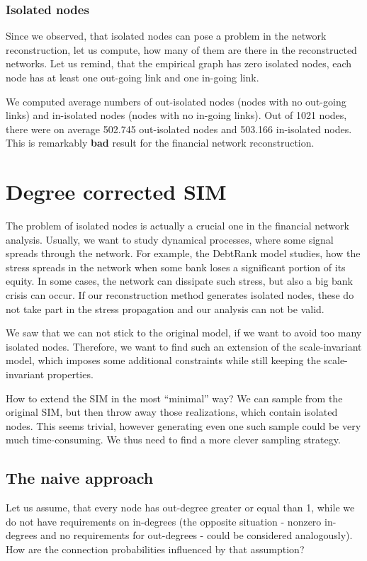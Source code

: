 \subsubsection{Isolated nodes}
Since we observed, that isolated nodes can pose a problem in the network reconstruction, let us compute, how many of them are there in the reconstructed networks. Let us remind, that the empirical graph has zero isolated nodes, each node has at least one out-going link and one in-going link.

We computed average numbers of out-isolated nodes (nodes with no out-going links) and in-isolated nodes (nodes with no in-going links). Out of 1021 nodes, there were on average 502.745 out-isolated nodes and 503.166 in-isolated nodes. This is remarkably \textbf{bad} result for the financial network reconstruction. 

\section{Degree corrected SIM}
The problem of isolated nodes is actually a crucial one in the financial network analysis. Usually, we want to study dynamical processes, where some signal spreads through the network. For example, the DebtRank model \cite{Bardoscia2015} studies, how the stress spreads in the network when some bank loses a significant portion of its equity. In some cases, the network can dissipate such stress, but also a big bank crisis can occur. If our reconstruction method generates isolated nodes, these do not take part in the stress propagation and our analysis can not be valid. 

We saw that we can not stick to the original model, if we want to avoid too many isolated nodes. Therefore, we want to find such an extension of the scale-invariant model, which imposes some additional constraints while still keeping the scale-invariant properties.

How to extend the SIM in the most ``minimal'' way? We can sample from the original SIM, but then throw away those realizations, which contain isolated nodes. This seems trivial, however generating even one such sample could be very much time-consuming. We thus need to find a more clever sampling strategy.

\subsection{The naive approach}
Let us assume, that every node has out-degree greater or equal than 1, while we do not have requirements on in-degrees (the opposite situation - nonzero in-degrees and no requirements for out-degrees - could be considered analogously). How are the connection probabilities influenced by that assumption?

